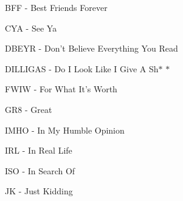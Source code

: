\documentclass[12pt]{report}
\begin{document}
\begin{adjustwidth}{0.5in}{0.0in}
BFF - Best Friends Forever \par

\end{adjustwidth}

\begin{adjustwidth}{0.5in}{0.0in}
CYA - See Ya\par

\end{adjustwidth}

\begin{adjustwidth}{0.5in}{0.0in}
DBEYR - Don't Believe Everything You Read\par

\end{adjustwidth}

\begin{adjustwidth}{0.5in}{0.0in}
DILLIGAS - Do I Look Like I Give A Sh$\ast$ $\ast$ \par

\end{adjustwidth}

\begin{adjustwidth}{0.5in}{0.0in}
FWIW - For What It's Worth \par

\end{adjustwidth}

\begin{adjustwidth}{0.5in}{0.0in}
GR8 - Great\par

\end{adjustwidth}

\begin{adjustwidth}{0.5in}{0.0in}
IMHO - In My Humble Opinion\par

\end{adjustwidth}

\begin{adjustwidth}{0.5in}{0.0in}
IRL - In Real Life\par

\end{adjustwidth}

\begin{adjustwidth}{0.5in}{0.0in}
ISO - In Search Of\par

\end{adjustwidth}

\begin{adjustwidth}{0.5in}{0.0in}
JK - Just Kidding\par

\end{adjustwidth}
\end{document}
